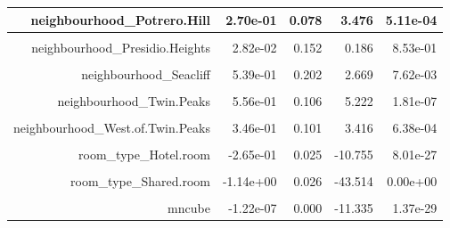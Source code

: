 \documentclass[justified, 11pt]{scrartcl}\usepackage[]{graphicx}\usepackage[]{xcolor}
\newenvironment{knitrout}{}{} %
\begin{document}
\begin{knitrout}
\begin{table}
\begin{tabular}{r|r|r|r|r}
\hline
neighbourhood\_Potrero.Hill & 2.70e-01 & 0.078 & 3.476 & 5.11e-04\\
\hline
\cellcolor{gray!6}{neighbourhood\_Presidio} & \cellcolor{gray!6}{4.10e-02} & \cellcolor{gray!6}{0.221} & \cellcolor{gray!6}{0.185} & \cellcolor{gray!6}{8.53e-01}\\
\hline
neighbourhood\_Presidio.Heights & 2.82e-02 & 0.152 & 0.186 & 8.53e-01\\
\hline
\cellcolor{gray!6}{neighbourhood\_Russian.Hill} & \cellcolor{gray!6}{-7.62e-02} & \cellcolor{gray!6}{0.122} & \cellcolor{gray!6}{-0.624} & \cellcolor{gray!6}{5.32e-01}\\
\hline
neighbourhood\_Seacliff & 5.39e-01 & 0.202 & 2.669 & 7.62e-03\\
\hline
\cellcolor{gray!6}{neighbourhood\_South.of.Market} & \cellcolor{gray!6}{-4.54e-02} & \cellcolor{gray!6}{0.086} & \cellcolor{gray!6}{-0.527} & \cellcolor{gray!6}{5.98e-01}\\
\hline
neighbourhood\_Twin.Peaks & 5.56e-01 & 0.106 & 5.222 & 1.81e-07\\
\hline
\cellcolor{gray!6}{neighbourhood\_Visitacion.Valley} & \cellcolor{gray!6}{2.18e-01} & \cellcolor{gray!6}{0.086} & \cellcolor{gray!6}{2.538} & \cellcolor{gray!6}{1.12e-02}\\
\hline
neighbourhood\_West.of.Twin.Peaks & 3.46e-01 & 0.101 & 3.416 & 6.38e-04\\
\hline
\cellcolor{gray!6}{neighbourhood\_Western.Addition} & \cellcolor{gray!6}{8.37e-02} & \cellcolor{gray!6}{0.098} & \cellcolor{gray!6}{0.853} & \cellcolor{gray!6}{3.93e-01}\\
\hline
room\_type\_Hotel.room & -2.65e-01 & 0.025 & -10.755 & 8.01e-27\\
\hline
\cellcolor{gray!6}{room\_type\_Private.room} & \cellcolor{gray!6}{-5.75e-01} & \cellcolor{gray!6}{0.019} & \cellcolor{gray!6}{-29.753} & \cellcolor{gray!6}{4.49e-186}\\
\hline
room\_type\_Shared.room & -1.14e+00 & 0.026 & -43.514 & 0.00e+00\\
\hline
\cellcolor{gray!6}{mnsqd} & \cellcolor{gray!6}{9.38e-05} & \cellcolor{gray!6}{0.000} & \cellcolor{gray!6}{17.989} & \cellcolor{gray!6}{3.55e-71}\\
\hline
mncube & -1.22e-07 & 0.000 & -11.335 & 1.37e-29\\
\hline
\end{tabular}
\endgroup{}
\end{table}

\end{knitrout}
\normalsize



{}

\end{document}
